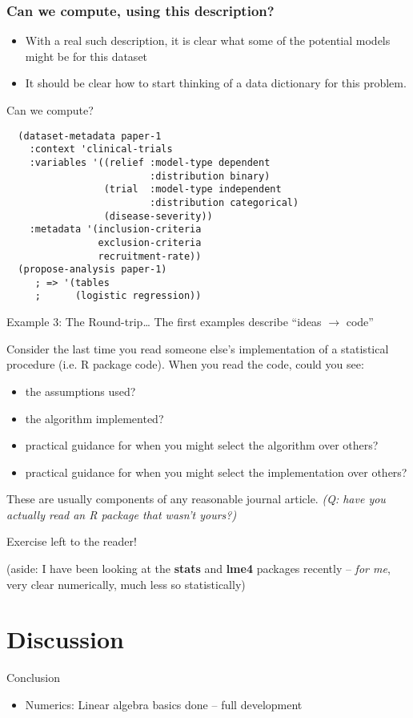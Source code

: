 \documentclass{beamer}
\begin{document}
\begin{frame}
  \frametitle{Can we compute, using this description?}
  \begin{itemize}
  \item With a real such description, it is clear what some of the
    potential models might be for this dataset
  \item It should be clear how to start thinking of a data dictionary
    for this problem.
  \end{itemize}
\end{frame}

\begin{frame}[fragile]{Can we compute?}
\begin{verbatim}
  (dataset-metadata paper-1
    :context 'clinical-trials
    :variables '((relief :model-type dependent
                         :distribution binary)
                 (trial  :model-type independent
                         :distribution categorical)
                 (disease-severity))
    :metadata '(inclusion-criteria
                exclusion-criteria
                recruitment-rate))
  (propose-analysis paper-1)
     ; => '(tables
     ;      (logistic regression))
\end{verbatim}
\end{frame}

\begin{frame}{Example 3: The Round-trip\ldots} 
  \label{example3}
  The first examples describe ``ideas $\rightarrow$ code''

  Consider the last time you read someone else's implementation of a
  statistical procedure (i.e. R package code).  When you read the
  code, could you see:
  \begin{itemize}
  \item the assumptions used?
  \item the algorithm implemented?
  \item practical guidance for when you might select the algorithm
    over others? 
  \item practical guidance for when you might select the
    implementation over others? 
  \end{itemize}
  These are usually components of any reasonable journal article.
  \textit{(Q: have you actually read an R package that wasn't yours?)}
\end{frame}

\begin{frame}{Exercise left to the reader!}

  (aside: I have been looking at the \textbf{stats} and \textbf{lme4}
  packages recently -- \textit{for me}, very clear numerically, much
  less so statistically)
\end{frame}



\section{Discussion}

\begin{frame}{Conclusion}
  \begin{itemize}
  \item Numerics: Linear algebra basics done -- full development 
  \end{itemize}
\end{frame}
\end{document}
